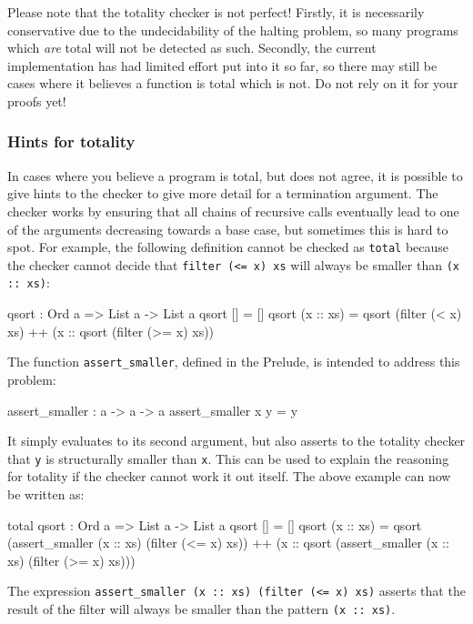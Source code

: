 Please note that the totality checker is not perfect! Firstly, it is necessarily
conservative due to the undecidability of the halting problem, so many programs
which \emph{are} total will not be detected as such. Secondly, the current
implementation has had limited effort put into it so far, so there may still
be cases where it believes a function is total which is not. Do not rely on it
for your proofs yet!

\subsubsection{Hints for totality}

In cases where you believe a program is total, but \Idris{} does not agree,
it is possible to give hints to the checker to give more detail for a
termination argument. The checker works by ensuring that all chains of
recursive calls eventually lead to one of the arguments decreasing towards
a base case, but sometimes this is hard to spot. For example, the following
definition cannot be checked as \texttt{total} because the checker cannot
decide that \texttt{filter (<= x) xs} will always be smaller than \texttt{(x :: xs)}:

\begin{code}
qsort : Ord a => List a -> List a
qsort [] = []
qsort (x :: xs)
   = qsort (filter (< x) xs) ++
      (x :: qsort (filter (>= x) xs))
\end{code}

\noindent
The function \texttt{assert\_smaller}, defined in the Prelude,
is intended to address this problem:

\begin{code}
assert_smaller : a -> a -> a
assert_smaller x y = y
\end{code}

\noindent
It simply evaluates to its second argument, but also asserts to the totality
checker that \texttt{y} is structurally smaller than \texttt{x}.  This can be
used to explain the reasoning for totality if the checker cannot work it out
itself. The above example can now be written as:
    
\begin{code}
total
qsort : Ord a => List a -> List a
qsort [] = []
qsort (x :: xs)
   = qsort (assert_smaller (x :: xs) (filter (<= x) xs)) ++
      (x :: qsort (assert_smaller (x :: xs) (filter (>= x) xs)))
\end{code}

\noindent
The expression \texttt{assert\_smaller (x :: xs) (filter (<= x) xs)} asserts
that the result of the filter will always be smaller than the pattern
\texttt{(x :: xs)}.

